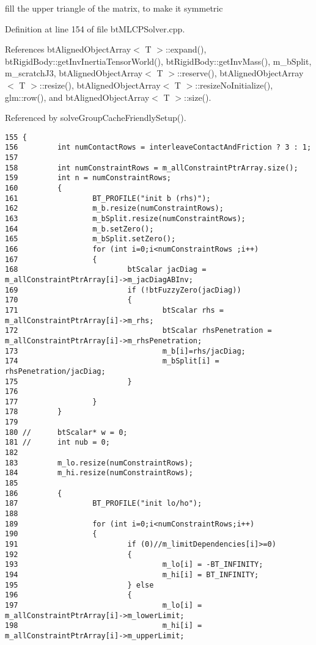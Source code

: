 fill the upper triangle of the matrix, to make it symmetric 

Definition at line 154 of file btMLCPSolver.cpp.

References btAlignedObjectArray$<$ T $>$::expand(), btRigidBody::getInvInertiaTensorWorld(), btRigidBody::getInvMass(), m\_\-bSplit, m\_\-scratchJ3, btAlignedObjectArray$<$ T $>$::reserve(), btAlignedObjectArray$<$ T $>$::resize(), btAlignedObjectArray$<$ T $>$::resizeNoInitialize(), glm::row(), and btAlignedObjectArray$<$ T $>$::size().

Referenced by solveGroupCacheFriendlySetup().

\begin{Code}\begin{verbatim}155 {
156         int numContactRows = interleaveContactAndFriction ? 3 : 1;
157 
158         int numConstraintRows = m_allConstraintPtrArray.size();
159         int n = numConstraintRows;
160         {
161                 BT_PROFILE("init b (rhs)");
162                 m_b.resize(numConstraintRows);
163                 m_bSplit.resize(numConstraintRows);
164                 m_b.setZero();
165                 m_bSplit.setZero();
166                 for (int i=0;i<numConstraintRows ;i++)
167                 {
168                         btScalar jacDiag = m_allConstraintPtrArray[i]->m_jacDiagABInv;
169                         if (!btFuzzyZero(jacDiag))
170                         {
171                                 btScalar rhs = m_allConstraintPtrArray[i]->m_rhs;
172                                 btScalar rhsPenetration = m_allConstraintPtrArray[i]->m_rhsPenetration;
173                                 m_b[i]=rhs/jacDiag;
174                                 m_bSplit[i] = rhsPenetration/jacDiag;
175                         }
176 
177                 }
178         }
179 
180 //      btScalar* w = 0;
181 //      int nub = 0;
182 
183         m_lo.resize(numConstraintRows);
184         m_hi.resize(numConstraintRows);
185  
186         {
187                 BT_PROFILE("init lo/ho");
188 
189                 for (int i=0;i<numConstraintRows;i++)
190                 {
191                         if (0)//m_limitDependencies[i]>=0)
192                         {
193                                 m_lo[i] = -BT_INFINITY;
194                                 m_hi[i] = BT_INFINITY;
195                         } else
196                         {
197                                 m_lo[i] = m_allConstraintPtrArray[i]->m_lowerLimit;
198                                 m_hi[i] = m_allConstraintPtrArray[i]->m_upperLimit;

\end{verbatim}
\end{Code}
